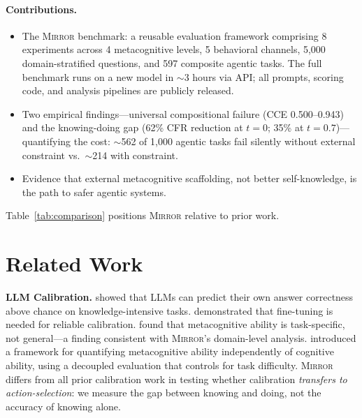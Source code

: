 \documentclass[10pt]{article}
\newcommand{\mirror}{\textsc{Mirror}}
\newcommand{\CCE}{CCE}
\newcommand{\CFR}{CFR}
\begin{document}
\paragraph{Contributions.}
\begin{itemize}
  \setlength\itemsep{2pt}
  \item The \mirror{} benchmark: a reusable evaluation framework comprising
        8 experiments across 4 metacognitive levels, 5 behavioral channels, 5,000
        domain-stratified questions, and 597 composite agentic tasks. The full
        benchmark runs on a new model in $\sim$3 hours via API; all prompts,
        scoring code, and analysis pipelines are publicly released.
  \item Two empirical findings---universal compositional failure
        (\CCE{} 0.500--0.943) and the knowing-doing gap (62\% \CFR{}
        reduction at $t\!=\!0$; 35\% at $t\!=\!0.7$)---quantifying the cost:
        $\sim$562 of 1,000 agentic tasks fail silently without external
        constraint vs.\ $\sim$214 with constraint.
  \item Evidence that external metacognitive scaffolding, not better
        self-knowledge, is the path to safer agentic systems.
\end{itemize}

Table~\ref{tab:comparison} positions \mirror{} relative to prior work.



\section{Related Work}
\label{sec:related}

\textbf{LLM Calibration.}
\citet{kadavath2022language} showed that LLMs can predict their own answer
correctness above chance on knowledge-intensive tasks.
\citet{kapoor2024calibration} demonstrated that fine-tuning is needed for reliable
calibration. \citet{steyvers2025calibration} found that metacognitive ability is
task-specific, not general---a finding consistent with \mirror{}'s domain-level
analysis. \citet{wang2025decoupling} introduced a framework for quantifying
metacognitive ability independently of cognitive ability, using a decoupled
evaluation that controls for task difficulty. \mirror{} differs from all prior calibration work in testing whether
calibration \textit{transfers to action-selection}: we measure the gap between
knowing and doing, not the accuracy of knowing alone.
\end{document}
